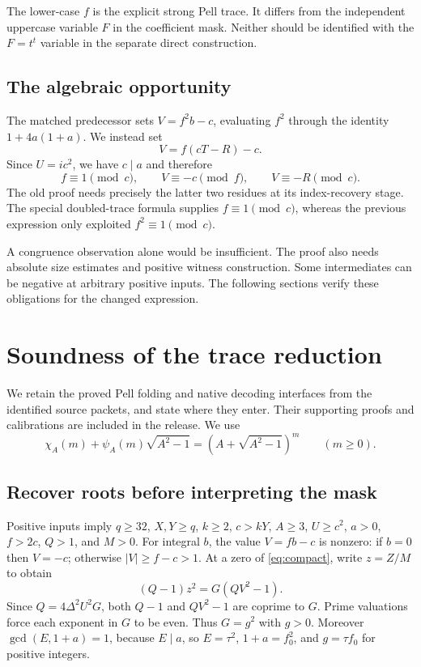 \documentclass[11pt]{article}
\theoremstyle{definition}
\begin{document}
The lower-case $f$ is the explicit strong Pell trace. It differs from
the independent uppercase variable $F$ in the coefficient mask. Neither
should be identified with the $F=t^t$ variable in the separate direct
construction.

\subsection{The algebraic opportunity}

The matched predecessor sets $V=f^2b-c$, evaluating $f^2$ through the
identity $1+4a(1+a)$. We instead set
\begin{equation}\label{eq:tracechange}
                  V=f(cT-R)-c.
\end{equation}
Since $U=ic^2$, we have $c\mid a$ and therefore
\begin{equation}\label{eq:residues}
 f\equiv1\pmod c,\qquad V\equiv-c\pmod f,\qquad V\equiv-R\pmod c.
\end{equation}
The old proof needs precisely the latter two residues at its index-recovery
stage. The special doubled-trace formula supplies $f\equiv1\pmod c$,
whereas the previous expression only exploited $f^2\equiv1\pmod c$.

A congruence observation alone would be insufficient. The proof also
needs absolute size estimates and positive witness construction. Some
intermediates can be negative at arbitrary positive inputs. The following
sections verify these obligations for the changed expression.

\section{Soundness of the trace reduction}

We retain the proved Pell folding and native decoding interfaces from the
identified source packets, and state where they enter. Their supporting
proofs and calibrations are included in the release. We use
\[
 \chi_A(m)+\psi_A(m)\sqrt{A^2-1}
       =(A+\sqrt{A^2-1})^m\qquad(m\ge0).
\]

\subsection{Recover roots before interpreting the mask}

Positive inputs imply $q\ge32$, $X,Y\ge q$, $k\ge2$, $c>kY$,
$A\ge3$, $U\ge c^2$, $a>0$, $f>2c$, $Q>1$, and $M>0$.
For integral $b$, the value $V=fb-c$ is nonzero: if $b=0$ then
$V=-c$; otherwise $|V|\ge f-c>1$.
At a zero of \eqref{eq:compact}, write $z=Z/M$ to obtain
\begin{equation}\label{eq:productnorm}
                    (Q-1)z^2=G(QV^2-1).
\end{equation}
Since $Q=4\Delta^2U^2G$, both $Q-1$ and $QV^2-1$ are coprime to
$G$. Prime valuations force each exponent in $G$ to be even. Thus
$G=g^2$ with $g>0$. Moreover $\gcd(E,1+a)=1$, because $E\mid a$,
so $E=\tau^2$, $1+a=f_0^2$, and $g=\tau f_0$ for positive integers.
\end{document}
